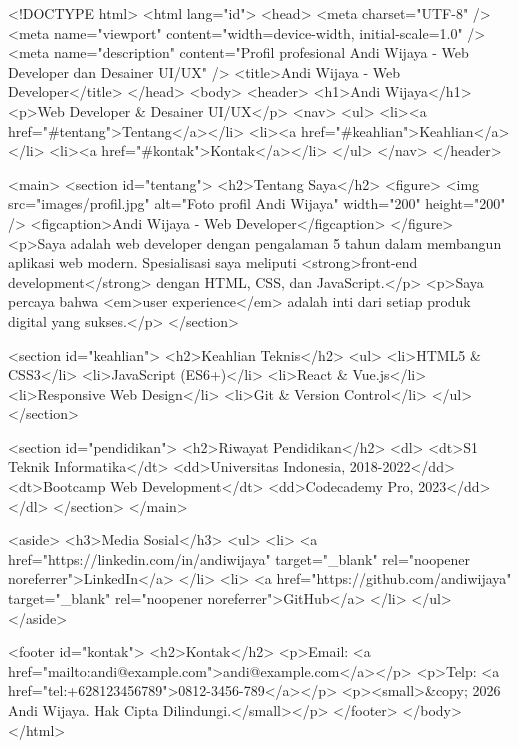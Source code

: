 \begin{webcode}[language=HTML, caption={Kode Lengkap Halaman Profil HTML5}]
<!DOCTYPE html>
<html lang="id">
<head>
  <meta charset="UTF-8" />
  <meta name="viewport" 
        content="width=device-width, initial-scale=1.0" />
  <meta name="description" 
        content="Profil profesional Andi Wijaya - 
                 Web Developer dan Desainer UI/UX" />
  <title>Andi Wijaya - Web Developer</title>
</head>
<body>
  <header>
    <h1>Andi Wijaya</h1>
    <p>Web Developer & Desainer UI/UX</p>
    <nav>
      <ul>
        <li><a href="#tentang">Tentang</a></li>
        <li><a href="#keahlian">Keahlian</a></li>
        <li><a href="#kontak">Kontak</a></li>
      </ul>
    </nav>
  </header>
  
  <main>
    <section id="tentang">
      <h2>Tentang Saya</h2>
      <figure>
        <img src="images/profil.jpg" 
             alt="Foto profil Andi Wijaya" 
             width="200" height="200" />
        <figcaption>Andi Wijaya - Web Developer</figcaption>
      </figure>
      <p>Saya adalah web developer dengan pengalaman 5 tahun 
         dalam membangun aplikasi web modern. Spesialisasi 
         saya meliputi <strong>front-end development</strong> 
         dengan HTML, CSS, dan JavaScript.</p>
      <p>Saya percaya bahwa <em>user experience</em> adalah 
         inti dari setiap produk digital yang sukses.</p>
    </section>
    
    <section id="keahlian">
      <h2>Keahlian Teknis</h2>
      <ul>
        <li>HTML5 & CSS3</li>
        <li>JavaScript (ES6+)</li>
        <li>React & Vue.js</li>
        <li>Responsive Web Design</li>
        <li>Git & Version Control</li>
      </ul>
    </section>
    
    <section id="pendidikan">
      <h2>Riwayat Pendidikan</h2>
      <dl>
        <dt>S1 Teknik Informatika</dt>
        <dd>Universitas Indonesia, 2018-2022</dd>
        <dt>Bootcamp Web Development</dt>
        <dd>Codecademy Pro, 2023</dd>
      </dl>
    </section>
  </main>
  
  <aside>
    <h3>Media Sosial</h3>
    <ul>
      <li>
        <a href="https://linkedin.com/in/andiwijaya" 
           target="_blank" 
           rel="noopener noreferrer">LinkedIn</a>
      </li>
      <li>
        <a href="https://github.com/andiwijaya" 
           target="_blank" 
           rel="noopener noreferrer">GitHub</a>
      </li>
    </ul>
  </aside>
  
  <footer id="kontak">
    <h2>Kontak</h2>
    <p>Email: <a href="mailto:andi@example.com">andi@example.com</a></p>
    <p>Telp: <a href="tel:+628123456789">0812-3456-789</a></p>
    <p><small>&copy; 2026 Andi Wijaya. Hak Cipta Dilindungi.</small></p>
  </footer>
</body>
</html>
\end{webcode}

